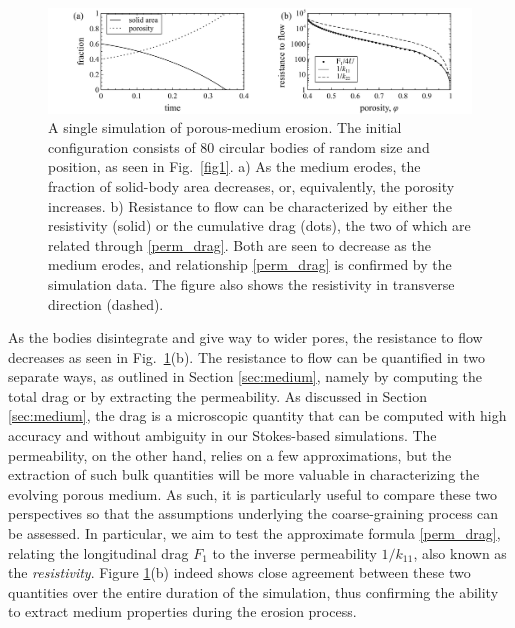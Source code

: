 \documentclass[3p]{elsarticle}
\begin{document}
\begin{figure}%
\centering
\includegraphics[width = 0.99 \textwidth]{./figs/fig2.pdf}
\caption{A single simulation of porous-medium erosion. The initial configuration consists of 80 circular bodies of random size and position, as seen in Fig.~\ref{fig1}. a) As the medium erodes, the fraction of solid-body area decreases, or, equivalently, the porosity increases. b) Resistance to flow can be characterized by either the resistivity (solid) or the cumulative drag (dots), the two of which are related through \eqref{perm_drag}. Both are seen to decrease as the medium erodes, and relationship \eqref{perm_drag} is confirmed by the simulation data. The figure also shows the resistivity in transverse direction (dashed).
 \label{fig2}
}
\end{figure}

As the bodies disintegrate and give way to wider pores, the resistance to flow decreases as seen in Fig.~\ref{fig2}(b). The resistance to flow can be quantified in two separate ways, as outlined in Section \ref{sec:medium}, namely by computing the total drag or by extracting the permeability. As discussed in Section \ref{sec:medium}, the drag is a microscopic quantity that can be computed with high accuracy and without ambiguity in our Stokes-based simulations. The permeability, on the other hand, relies on a few approximations, but the extraction of such bulk quantities will be more valuable in characterizing the evolving porous medium. As such, it is particularly useful to compare these two perspectives so that the assumptions underlying the coarse-graining process can be assessed. In particular, we aim to test the approximate formula \eqref{perm_drag}, relating the longitudinal drag $F_1$ to the inverse permeability $1/k_{11}$, also known as the {\em resistivity}. Figure \ref{fig2}(b) indeed shows close agreement between these two quantities over the entire duration of the simulation, thus confirming the ability to extract medium properties during the erosion process.
\end{document}
